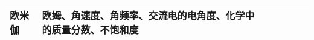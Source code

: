 \begin{longtable}[]{@{}m{0.8cm}m{0.8cm}m{0.8cm}m{2.2cm}m{1.5cm}m{1.6cm}m{6cm}@{}}
\begin{minipage}[t]{0.12\columnwidth}
欧米伽\strut
\end{minipage} &
欧姆、角速度、角频率、交流电的电角度、化学中的质量分数、不饱和度\tabularnewline
\bottomrule
\end{longtable}
